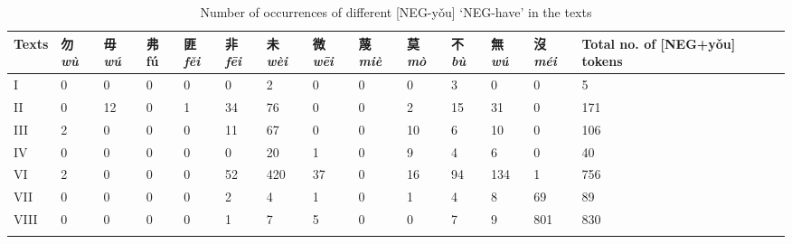 \documentclass[output=paper,colorlinks,citecolor=brown,chinesefont]{langscibook}
\begin{document}
\begin{paperappendix}
\clearpage
\begin{table}[t]
\small
	\caption{Number of occurrences of different [NEG-yǒu] ‘NEG-have’ in the texts}
	\label{tab:lamB2}
	\begin{tabularx}{\textwidth}{l@{~}Y@{~}Y@{~}Y@{~}Y@{~}Y@{~}Y@{~}Y@{~}Y@{~}Y@{~}Y@{~}Y@{~}Y R{1.7cm}}
	\lsptoprule
	Texts
	& {\cn 勿}\newline  \textit{wù}
	& {\cn 毋}\newline  \textit{wú}
	& {\cn 弗}\newline  fú
	& {\cn 匪}\newline  \textit{fěi}
	& {\cn 非}\newline  \textit{fēi}
	& {\cn 未}\newline  \textit{wèi}
	& {\cn 微}\newline  \textit{wēi}
	& {\cn 蔑}\newline  \textit{miè}
	& {\cn 莫}\newline  \textit{mò}
	& {\cn 不}\newline  \textit{bù}
	& {\cn 無}\newline  \textit{wú}
	& {\cn 沒}\newline  \textit{méi}
	& {Total no. of}  {{[}NEG+yǒu{]}}  {tokens} \\
	\midrule
	I & 0 & 0 & 0 & 0 & 0 & 2 & 0 & 0 & 0 & 3 & 0 & 0 & {5} \\
	II & 0 & 12 & 0 & 1 & 34 & 76 & 0 & 0 & 2 & 15 & 31 & 0 & {171} \\
	III & 2 & 0 & 0 & 0 & 11 & 67 & 0 & 0 & 10 & 6 & 10 & 0 & {106} \\
	IV & 0 & 0 & 0 & 0 & 0 & 20 & 1 & 0 & 9 & 4 & 6 & 0 & {40} \\
	VI & 2 & 0 & 0 & 0 & 52 & 420 & 37 & 0 & 16 & 94 & 134 & 1 & {756} \\
	VII & 0 & 0 & 0 & 0 & 2 & 4 & 1 & 0 & 1 & 4 & 8 & 69 & {89} \\
	VIII & 0 & 0 & 0 & 0 & 1 & 7 & 5 & 0 & 0 & 7 & 9 & 801 & {830} \\
\lspbottomrule
	\end{tabularx}
\end{table}
\end{paperappendix}




{\sloppy\printbibliography[heading=subbibliography,notkeyword=this]}
\end{document}
